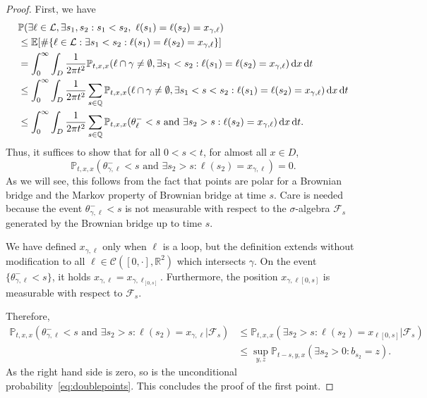 \documentclass[11pt]{article}
\def\d{\,{\rm d}}
\def\P{{\mathbb P}}
\def\cF{{\mathcal F}}
\begin{document}
\begin{proof}
    First, we have
    \begin{align*}
        &\mathbb{P}(\exists \ell \in \mathcal{L}, \exists s_1,s_2: s_1<s_2, \ \ell(s_1)=\ell(s_2)=x_{\gamma,\ell} ) \\
        &\leq \mathbb{E}[ \# \{ \ell \in \mathcal{L}: \exists s_1<s_2:  \ell(s_1)=\ell(s_2)=x_{\gamma,\ell} \}   ]\\
        &= \int_0^\infty \int_D \frac{1}{2 \pi t^2} \mathbb{P}_{t,x,x}( \ell \cap \gamma\neq \emptyset ,
        \exists s_1<s_2:  \ell(s_1)=\ell(s_2)=x_{\gamma,\ell}
        ) \d x \d t \\
        &\leq
        \int_0^\infty \int_D \frac{1}{2 \pi t^2}
        \sum_{s\in \mathbb{Q}}
        \mathbb{P}_{t,x,x}( \ell \cap \gamma\neq \emptyset ,
        \exists s_1<s< s_2 :  \ell(s_1)=\ell(s_2)=x_{\gamma,\ell}
        )\d x \d t \\
        &\leq
        \int_0^\infty \int_D \frac{1}{2 \pi t^2}
        \sum_{s\in \mathbb{Q}}
        \mathbb{P}_{t,x,x}( \theta^-_\ell<s \text{ and }
        \exists s_2>s :  \ell(s_2)=x_{\gamma,\ell}
        )\d x \d t .
    \end{align*}
    Thus, it suffices to show that for all $0<s<t$, for almost all $x\in D$,
    \begin{equation}\label{eq:doublepoints}
        \mathbb{P}_{t,x,x}( \theta^-_{\gamma,\ell}<s \text{ and }
    \exists s_2>s :  \ell(s_2)=x_{\gamma,\ell}
    )=0.
        \end{equation}
    As we will see, this follows from the fact that points are polar for a Brownian bridge and the Markov property of Brownian bridge at time $s$. Care is needed because the event $\theta^-_{\gamma,\ell} <s$ is not
    measurable with respect to the $\sigma$-algebra $\cF_s$ generated by the Brownian bridge up to time $s$.

    We have defined $x_{\gamma,\ell}$ only when $\ell$ is a loop, but the definition extends without modification to all $\ell\in \mathcal{C}([0,\cdot],\mathbb{R}^2)$ which intersects $\gamma$.
    On the event $\{ \theta^-_{\gamma,\ell} < s \}$, it holds $x_{\gamma,\ell} = x_{\gamma,\ell_{[0,s]} }$. Furthermore, the position $x_{\gamma,\ell[0,s]}$ is measurable with respect to $\cF_s$.


    Therefore,
    \begin{align*}
        \P_{t,x,x} ( \theta_{\gamma,\ell}^-<s \text{ and }
    \exists s_2>s :  \ell(s_2)=x_{\gamma,\ell} | \cF_s) & \leq\mathbb{P}_{t,x,x} ( \exists s_2 > s: \ell (s_2) = x_{\ell[0,s]} |\cF_s)\\
    & \leq \sup_{y,z}  \P_{t-s, y,x} ( \exists s_2 >0 : b_{s_2} = z).
    \end{align*}
  As the right hand side is zero, so is the unconditional probability~\eqref{eq:doublepoints}. This concludes the proof of the first point.


\end{proof}
\end{document}
